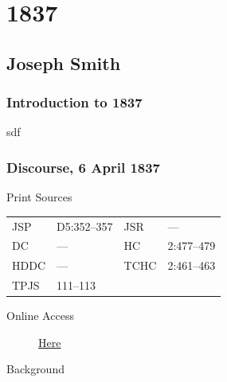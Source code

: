 \section{1837}
	\label{EMS-1837}
	
	\subsection{Joseph Smith}
		\label{EMS-1837-JS}

		\subsubsection{Introduction to 1837}
	
			sdf
		
		\subsubsection{Discourse, 6 April 1837}
			\label{EMS-1837-JS-6-APR-1837}
			
			\begin{description}
					\item[Print Sources]
				\end{description}

					\begin{tabular}{p{0.5in}p{1in}p{0.5in}p{1in}}
					JSP	 	& D5:352--357		& JSR 		& --- \\
					DC	 	& ---				& HC 		& 2:477--479 \\
					HDDC 	& ---				& TCHC 		& 2:461--463 \\
					TPJS 	& 111--113			& 	 		&  \\
					\end{tabular}
				
				\begin{description}
					\item[Online Access] \href{https://www.josephsmithpapers.org/paper-summary/discourse-6-april-1837/1}{Here}
				\end{description}
				
				\begin{description}
					\item[Background]
				\end{description}
				
